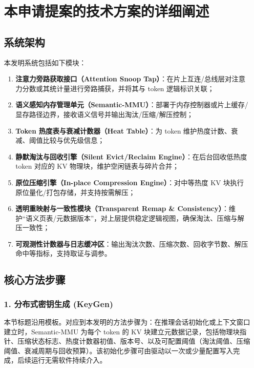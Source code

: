 \documentclass[12pt,a4paper]{article}
\begin{document}
\section{本申请提案的技术方案的详细阐述}

\subsection{系统架构}

本发明系统包括如下模块：
\begin{enumerate}
    \item \textbf{注意力旁路获取接口（Attention Snoop Tap）}：在片上互连/总线层对注意力分数或其统计量进行旁路捕获，并将其与 token 逻辑标识关联；
    \item \textbf{语义感知内存管理单元（Semantic-MMU）}：部署于内存控制器或片上缓存/显存路径边界，接收语义信号并输出淘汰/压缩/解压控制；
    \item \textbf{Token 热度表与衰减计数器（Heat Table）}：为 token 维护热度计数、衰减、阈值比较与优先级信息；
    \item \textbf{静默淘汰与回收引擎（Silent Evict/Reclaim Engine）}：在后台回收低热度 token 对应的 KV 物理块，维护空闲链表与碎片合并；
    \item \textbf{原位压缩引擎（In-place Compression Engine）}：对中等热度 KV 块执行原位量化/打包存储，并支持按需解压；
    \item \textbf{透明重映射与一致性模块（Transparent Remap \& Consistency）}：维护“语义页表/元数据版本”，对上层提供稳定逻辑视图，确保淘汰、压缩与解压一致性；
    \item \textbf{可观测性计数器与日志缓冲区}：输出淘汰次数、压缩次数、回收字节数、解压命中等指标，支持取证与调参。
\end{enumerate}

\subsection{核心方法步骤}

\subsubsection{1. 分布式密钥生成 (KeyGen)}
本节标题沿用模板。对应到本发明的方法步骤为：在推理会话初始化或上下文窗口建立时，Semantic-MMU 为每个 token 的 KV 块建立元数据记录，包括物理块指针、压缩状态标志、热度计数器初值、版本号、以及可配置阈值（淘汰阈值、压缩阈值、衰减周期与回收预算）。该初始化步骤可由驱动以一次或少量配置写入完成，后续运行无需软件持续介入。
\end{document}
